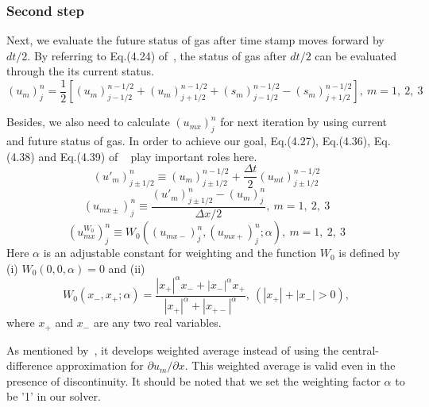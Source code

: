 \documentclass[a4paper,12pt]{article}
\begin{document}
\subsubsection{Second step}
 \label{subsubsection:second_step}
Next, we evaluate the future status of gas after time stamp moves forward 
by $dt/2$. By referring to Eq.(4.24) of~\cite{CESE_Shin_Chung_Chang_1995}, the 
status of gas after $dt/2$ can be evaluated through the its current status.
\begin{equation}
(u_{m})^{n}_{j}=\frac{1}{2}[(u_{m})^{n-1/2}_{j-1/2}+(u_{m})^{n-1/2}_{j+1/2}
+(s_{m})^{n-1/2}_{j-1/2}-(s_{m})^{n-1/2}_{j+1/2}],~m=1,~2,~3
\end{equation}

Besides, we also need to calculate $(u_{mx})^{n}_{j}$ for next iteration by 
using current and future status of gas. In order to achieve our goal, Eq.(4.27), 
Eq.(4.36), Eq.(4.38) and Eq.(4.39) of ~\cite{CESE_Shin_Chung_Chang_1995} play 
important roles here. 
\begin{equation}
(u'_{m})^{n}_{j\pm1/2}\equiv(u_{m})^{n-1/2}_{j\pm1/2}
+\frac{\Delta t}{2}(u_{mt})^{n-1/2}_{j\pm1/2}
\end{equation}
\begin{equation}
(u_{mx\pm})^{n}_{j}\equiv\frac{(u'_{m})^{n}_{j\pm1/2}-(u_{m})^{n}_{j}}{\Delta x/2}
,~m=1,~2,~3
\end{equation}
\begin{equation}
(u^{W_{0}}_{mx})^{n}_{j}\equiv W_{0}((u_{mx-})^{n}_{j},(u_{mx+})^{n}_{j};\alpha)
,~m=1,~2,~3
\end{equation}
Here $\alpha$ is an adjustable constant for weighting and the function $W_{0}$ 
is defined by (i) $W_{0}(0, 0, \alpha)=0$ and (ii)
\begin{equation}
W_{0}(x_{-},x_{+};\alpha )=\frac{|x_{+}|^{\alpha}x_{-}+|x_{-}|^{\alpha}x_{+}}
{|x_{+}|^{\alpha}+|x_{+-}|^{\alpha}},~(|x_{+}|+|x_{-}|>0),
\end{equation}
where $x_{+}$ and $x_{-}$ are any two real variables.

As mentioned by~\cite{CESE_Shin_Chung_Chang_1995}, it develops weighted average 
instead of using the central-difference approximation for $\partial u_{m}/\partial x$. 
This weighted average is valid even in the presence of discontinuity. It should 
be noted that we set the weighting factor $\alpha$ to be '1' in our solver.
\end{document}
